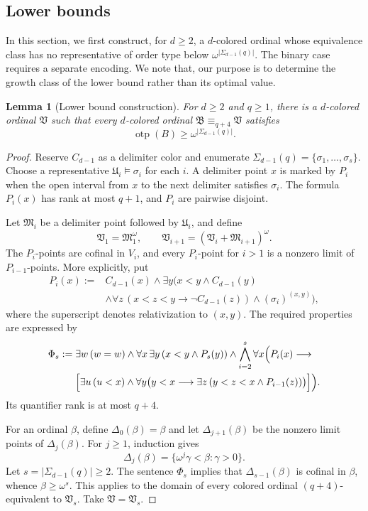\documentclass{amsart}
\newtheorem{lemma}{Lemma}
\theoremstyle{definition}
\begin{document}
\subsection{Lower bounds}

In this section, we first construct, for $d\geq2$, a $d$-colored ordinal whose equivalence class has no representative of order type below $\omega^{|\Sigma_{d-1}(q)|}$. The binary case requires a separate encoding. We note that, our purpose is to determine the growth class of the lower bound rather than its optimal value.


\begin{lemma}[Lower bound construction]\label{lem:marker-hierarchy}
    For $d\geq2$ and $q\geq1$, there is a $d$-colored ordinal
    $\mathfrak V$ such that every $d$-colored ordinal
    $\mathfrak B\equiv_{q+4}\mathfrak V$ satisfies
    $$\operatorname{otp}(B)\geq\omega^{|\Sigma_{d-1}(q)|}.$$
  \end{lemma}
\begin{proof}
    Reserve $C_{d-1}$ as a delimiter color and enumerate $\Sigma_{d-1}(q)=\{\sigma_1,\ldots,\sigma_s\}$. Choose a representative $\mathfrak U_i\models\sigma_i$ for each $i$. A delimiter point $x$ is marked by $P_i$ when the open interval from $x$ to the next delimiter satisfies $\sigma_i$. The formula $P_i(x)$ has rank at most $q+1$, and $P_i$ are pairwise disjoint.
    
    Let $\mathfrak M_i$ be a delimiter point followed by $\mathfrak U_i$, and define
    $$\mathfrak V_1=\mathfrak M_1^\omega,\qquad \mathfrak V_{i+1}=(\mathfrak V_i+\mathfrak M_{i+1})^\omega.$$
    The $P_i$-points are cofinal in $V_i$, and every $P_i$-point for $i>1$ is a nonzero limit of $P_{i-1}$-points. More explicitly, put
    \[\begin{split}
        P_i(x):={}&C_{d-1}(x)\wedge\exists y\bigl(x<y\wedge C_{d-1}(y)\\
        &\wedge\forall z\,(x<z<y\longrightarrow\neg C_{d-1}(z))\wedge (\sigma_i)^{(x,y)}\bigr),
    \end{split}\]
    where the superscript denotes relativization to $(x,y)$. The required properties are expressed by
    \[\begin{split}
        \Phi_s:={}&\exists w\,(w=w)\wedge\forall x\,\exists y\,(x<y\wedge P_s(y))\wedge\bigwedge_{i=2}^s\forall x\Bigl(P_i(x)\longrightarrow\\
        &\Bigl[\exists u\,(u<x)\wedge\forall y\bigl(y<x\longrightarrow\exists z\,(y<z<x\wedge P_{i-1}(z))\bigr)\Bigr]\Bigr).
    \end{split}\]
    Its quantifier rank is at most $q+4$.

    For an ordinal $\beta$, define $\Delta_0(\beta)=\beta$ and let $\Delta_{j+1}(\beta)$ be the nonzero limit points of $\Delta_j(\beta)$. For $j\geq1$, induction gives
    $$\Delta_j(\beta)=\{\omega^j\gamma<\beta:\gamma>0\}.$$
    Let $s=|\Sigma_{d-1}(q)|\geq2$. The sentence $\Phi_s$ implies that $\Delta_{s-1}(\beta)$ is cofinal in $\beta$, whence $\beta\geq\omega^s$. This applies to the domain of every colored ordinal $(q+4)$-equivalent to $\mathfrak V_s$. Take $\mathfrak V=\mathfrak V_s$.
\end{proof}
\end{document}
